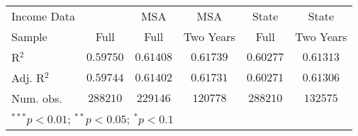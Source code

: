 \begin{tabular}{l c c c c c}
Income Data          &                  & MSA              & MSA              & State            & State            \\
Sample               & Full             & Full             & Two Years        & Full             & Two Years        \\
R$^2$                & $0.59750$        & $0.61408$        & $0.61739$        & $0.60277$        & $0.61313$        \\
Adj. R$^2$           & $0.59744$        & $0.61402$        & $0.61731$        & $0.60271$        & $0.61306$        \\
Num. obs.            & $288210$         & $229146$         & $120778$         & $288210$         & $132575$         \\
\hline
\multicolumn{6}{l}{\scriptsize{$^{***}p<0.01$; $^{**}p<0.05$; $^{*}p<0.1$}}
\end{tabular}
